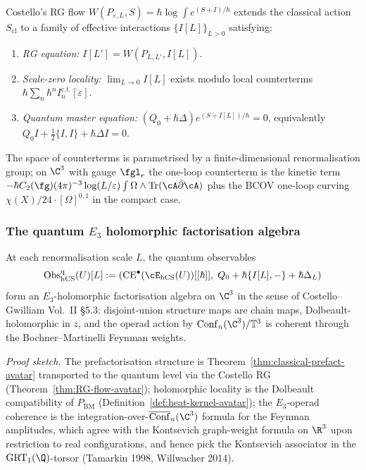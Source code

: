 \begin{theorem}
\label{thm:RG-flow-avatar}
Costello's RG flow $W(P_{\varepsilon, L}, S) = \hbar \log \int e^{(S + I)/\hbar}$ extends the classical action $S_{\mathrm{cl}}$ to a family of effective interactions $\{I[L]\}_{L>0}$ satisfying:
\begin{enumerate}
\item \emph{RG equation:} $I[L'] = W(P_{L, L'}, I[L])$.
\item \emph{Scale-zero locality:} $\lim_{L \to 0} I[L]$ exists modulo local counterterms $\hbar \sum_n \hbar^n I^{\mathrm{c.t.}}_n[\varepsilon]$.
\item \emph{Quantum master equation:} $(Q_0 + \hbar \Delta) e^{(S + I[L])/\hbar} = 0$, equivalently $Q_0 I + \tfrac{1}{2}\{I, I\} + \hbar \Delta I = 0$.
\end{enumerate}
The space of counterterms is parametrised by a finite-dimensional renormalisation group; on $\C^3$ with gauge $\fgl_r$ the one-loop counterterm is the kinetic term $- \hbar C_2(\fg)(4\pi)^{-3} \log(L/\varepsilon) \int \Omega \wedge \mathrm{Tr}(\cA \bar\partial \cA)$ plus the BCOV one-loop curving $\chi(X)/24 \cdot [\Omega]^{0,1}$ in the compact case.
\end{theorem}

\subsubsection{The quantum $E_3$ holomorphic factorisation algebra}
\label{sssec:quantum-E3-factorisation}

\begin{theorem}
\label{thm:quantum-obs-E3-avatar}
At each renormalisation scale $L$, the quantum observables
\[
\mathrm{Obs}^{\mathrm{q}}_{\hCS}(U)[L] := \left( \mathrm{CE}^\bullet(\cE_{\hCS}(U))[[\hbar]], \; Q_0 + \hbar \{I[L], -\} + \hbar \Delta_L \right)
\]
form an $E_3$-holomorphic factorisation algebra on $\C^3$ in the sense of Costello--Gwilliam Vol.~II §5.3: disjoint-union structure maps are chain maps, Dolbeault-holomorphic in $z$, and the operad action by $\mathrm{Conf}_n(\C^3) / \mathbb{T}^3$ is coherent through the Bochner--Martinelli Feynman weights.

\noindent
\emph{Proof sketch.} The prefactorisation structure is Theorem~\ref{thm:classical-prefact-avatar} transported to the quantum level via the Costello RG (Theorem~\ref{thm:RG-flow-avatar}); holomorphic locality is the Dolbeault compatibility of $P_{\mathrm{BM}}$ (Definition~\ref{def:heat-kernel-avatar}); the $E_3$-operad coherence is the integration-over-$\overline{\mathrm{Conf}}_n(\C^3)$ formula for the Feynman amplitudes, which agree with the Kontsevich graph-weight formula on $\R^3$ upon restriction to real configurations, and hence pick the Kontsevich associator in the $\mathrm{GRT}_1(\Q)$-torsor (Tamarkin 1998, Willwacher 2014).
\end{theorem}

